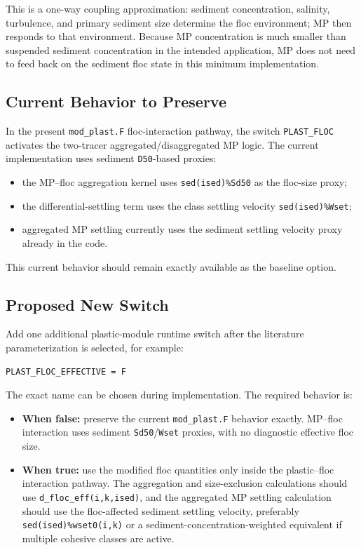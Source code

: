 \documentclass[11pt]{article}
\begin{document}
This is a one-way coupling approximation: sediment concentration, salinity,
turbulence, and primary sediment size determine the floc environment; MP then
responds to that environment.  Because MP concentration is much smaller than
suspended sediment concentration in the intended application, MP does not need
to feed back on the sediment floc state in this minimum implementation.

\subsection*{Current Behavior to Preserve}

In the present \texttt{mod\_plast.F} floc-interaction pathway, the switch
\texttt{PLAST\_FLOC} activates the two-tracer aggregated/disaggregated MP
logic.  The current implementation uses sediment \texttt{D50}-based proxies:
\begin{itemize}
  \item the MP--floc aggregation kernel uses \texttt{sed(ised)\%Sd50} as the
        floc-size proxy;
  \item the differential-settling term uses the class settling velocity
        \texttt{sed(ised)\%Wset};
  \item aggregated MP settling currently uses the sediment settling velocity
        proxy already in the code.
\end{itemize}
This current behavior should remain exactly available as the baseline option.

\subsection*{Proposed New Switch}

Add one additional plastic-module runtime switch after the literature
parameterization is selected, for example:
\begin{verbatim}
PLAST_FLOC_EFFECTIVE = F
\end{verbatim}
The exact name can be chosen during implementation.  The required behavior is:
\begin{itemize}
  \item \textbf{When false:} preserve the current \texttt{mod\_plast.F}
        behavior exactly.  MP--floc interaction uses sediment
        \texttt{Sd50}/\texttt{Wset} proxies, with no diagnostic effective floc
        size.
  \item \textbf{When true:} use the modified floc quantities only inside the
        plastic--floc interaction pathway.  The aggregation and size-exclusion
        calculations should use \texttt{d\_floc\_eff(i,k,ised)}, and the
        aggregated MP settling calculation should use the floc-affected
        sediment settling velocity, preferably \texttt{sed(ised)\%wset0(i,k)}
        or a sediment-concentration-weighted equivalent if multiple cohesive
        classes are active.
\end{itemize}
\end{document}
